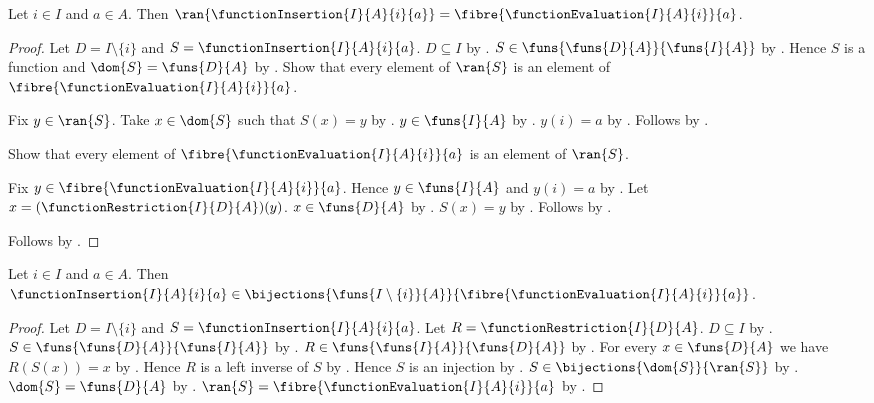 \begin{theorem}\label{function_insertion_range}
    Let $i\in I$ and $a\in A$.
    Then $\ran{\functionInsertion{I}{A}{i}{a}}
        =\fibre{\functionEvaluation{I}{A}{i}}{a}$.
\end{theorem}
\begin{proof}
    Let $D=I\setminus\{i\}$ and $S=\functionInsertion{I}{A}{i}{a}$.
    $D\subseteq I$ by .
    $S\in\funs{\funs{D}{A}}{\funs{I}{A}}$ by .
    Hence $S$ is a function and $\dom{S}=\funs{D}{A}$ by .
    Show that every element of $\ran{S}$ is an element of
        $\fibre{\functionEvaluation{I}{A}{i}}{a}$.
    \begin{subproof}
        Fix $y\in\ran{S}$.
        Take $x\in\dom{S}$ such that $S(x)=y$ by .
        $y\in\funs{I}{A}$ by .
        $y(i)=a$ by .
        Follows by .
    \end{subproof}
    Show that every element of $\fibre{\functionEvaluation{I}{A}{i}}{a}$
        is an element of $\ran{S}$.
    \begin{subproof}
        Fix $y\in\fibre{\functionEvaluation{I}{A}{i}}{a}$.
        Hence $y\in\funs{I}{A}$ and $y(i)=a$ by .
        Let $x=(\functionRestriction{I}{D}{A})(y)$.
        $x\in\funs{D}{A}$ by .
        $S(x)=y$ by .
        Follows by .
    \end{subproof}
    Follows by .
\end{proof}

\begin{theorem}\label{function_insertion_bijection}
    Let $i\in I$ and $a\in A$.
    Then $\functionInsertion{I}{A}{i}{a}\in
        \bijections{\funs{I\setminus\{i\}}{A}}{\fibre{\functionEvaluation{I}{A}{i}}{a}}$.
\end{theorem}
\begin{proof}
    Let $D=I\setminus\{i\}$ and $S=\functionInsertion{I}{A}{i}{a}$.
    Let $R=\functionRestriction{I}{D}{A}$.
    $D\subseteq I$ by .
    $S\in\funs{\funs{D}{A}}{\funs{I}{A}}$ by .
    $R\in\funs{\funs{I}{A}}{\funs{D}{A}}$ by .
    For every $x\in\funs{D}{A}$ we have $R(S(x))=x$ by
        .
    Hence $R$ is a left inverse of $S$ by .
    Hence $S$ is an injection by .
    $S\in\bijections{\dom{S}}{\ran{S}}$ by .
    $\dom{S}=\funs{D}{A}$ by .
    $\ran{S}=\fibre{\functionEvaluation{I}{A}{i}}{a}$ by .
\end{proof}

